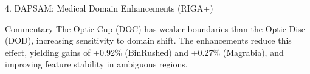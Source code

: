 \documentclass[aspectratio=169, 10pt]{beamer}
\begin{document}
\begin{frame}{4. DAPSAM: Medical Domain Enhancements (RIGA+)}
    \begin{table}[htbp]
    \centering
    \caption{RIGA+ BinRushed: Reproduced vs Enhanced (Dice Score \%)}
    \end{table}

    \begin{table}[htbp]
    \centering
    \caption{RIGA+ Magrabia: Reproduced vs Enhanced (Dice Score \%)}
    \end{table}

    \begin{alertblock}{Commentary}
\footnotesize
The Optic Cup (DOC) has weaker boundaries than the Optic Disc (DOD), increasing sensitivity to domain shift. The enhancements reduce this effect, yielding gains of +0.92\% (BinRushed) and +0.27\% (Magrabia), and improving feature stability in ambiguous regions.
\end{alertblock}
    
\end{frame}



\end{document}
